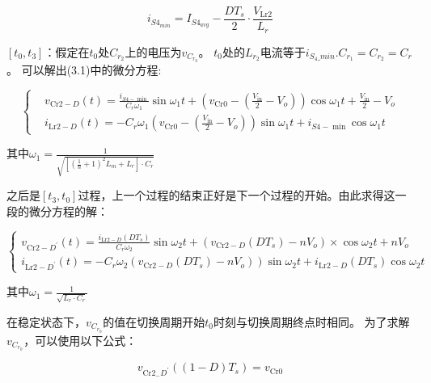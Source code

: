 \documentclass[12pt,a4paper]{report}
\begin{document}
\begin{equation}
    i_{S4_{min}} =I_{S4_{avg}}-\frac{D T_{s}}{2} \cdot \frac{V_{\mathrm{Lr} 2}}{L_{r}}
\end{equation}

$[t_0,t_3]$：假定在$t_0$处$C_{r_2}$上的电压为$v_{C_{r_0}}$。 $t_0$处的$L_{r_2}$电流等于$i_{S_4\_min}$.$C_{r_1} = C_{r_2} = C_r$。 可以解出(3.1)中的微分方程:

\begin{equation}
    \left\{\begin{aligned}
         & v_{\mathrm{Cr} 2-D}(t)=\frac{i_{S 4-\min }}{C_{r} \omega_{1}} \sin \omega_{1} t+\left(v_{\mathrm{Cr} 0}-\left(\frac{V_{\mathrm{in}}}{2}-V_{o}\right)\right) \cos \omega_{1} t+\frac{V_{\mathrm{in}}}{2}-V_{o} \\
         & i_{\mathrm{Lr} 2-D}(t)=-C_{r} \omega_{1}\left(v_{\mathrm{Cr} 0}-\left(\frac{V_{\mathrm{in}}}{2}-V_{o}\right)\right) \sin \omega_{1} t +i_{S 4-\min } \cos \omega_{1} t
    \end{aligned}
    \right.
\end{equation}

其中$\omega_{1}=\frac{1}{\sqrt{\left[\left(\frac{1}{n}+1\right)^{2} L_{m}+L_{r}\right] \cdot C_{r}}}$

之后是$[t_3,t_0]$过程，上一个过程的结束正好是下一个过程的开始。由此求得这一段的微分方程的解：

\begin{equation}
    \left\{\begin{aligned}
        v_{\mathrm{Cr} 2-D^{\prime}}(t)=\frac{i_{\mathrm{Lr} 2-D}\left(D T_{s}\right)}{C_{r} \omega_{2}} \sin \omega_{2} t+\left(v_{\mathrm{Cr} 2-D}\left(D T_{s}\right)-n V_{o}\right)\times \cos \omega_{2} t+n V_{o} \\
        i_{\mathrm{Lr} 2-D^{\prime}}(t)=-\left.C_{r} \omega_{2}\left(v_{\mathrm{Cr} 2-D}\left(D T_{s}\right)-n V_{o}\right)\right) \sin \omega_{2} t+i_{\mathrm{Lr} 2-D}\left(D T_{s}\right) \cos \omega_{2} t
    \end{aligned}\right.
\end{equation}

其中$\omega_{1}=\frac{1}{\sqrt{L_r\cdot C_{r}}}$

在稳定状态下，$v_{C_{r_0}}$的值在切换周期开始$t_0$时刻与切换周期终点时相同。 为了求解$v_{C_{r_0}}$，可以使用以下公式：

\begin{equation}
    v_{\mathrm{Cr} 2_{-} D^{\prime}}\left((1-D) T_{s}\right)=v_{\mathrm{Cr} 0}
\end{equation}
\end{document}
